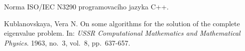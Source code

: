 \documentclass[11pt,a4paper]{article}
\newcommand{\cpp}{\textsc{C++}}
\theoremstyle{remark}
\begin{document}
\pagebreak

\begin{thebibliography}{9}

Norma \textsc{ISO/IEC N3290} programovacího jazyka \cpp.

  {\sc Kublanovskaya}, Vera N.
  On some algorithms for the solution of the complete eigenvalue problem.
  In: \emph{USSR Computational Mathematics and Mathematical Physics\/}.
  1963,
  no.~3,
  vol.~8,
  pp.~637-657.

\end{thebibliography}
\end{document}
